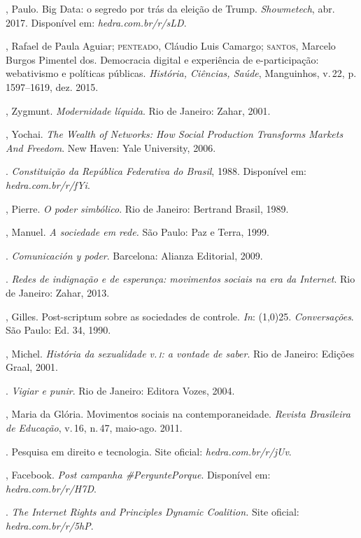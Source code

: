 \begin{bibliohedra}
, Paulo. Big Data: o segredo por trás da eleição de Trump. \textit{Showmetech}, abr. 2017. Disponível em: \textit{hedra.com.br/r/sLD}.

, Rafael de Paula Aguiar; \textsc{penteado}, Cláudio Luis Camargo; \textsc{santos}, Marcelo Burgos Pimentel dos. Democracia digital e experiência de
e-participação: webativismo e políticas públicas. \textit{História, Ciências,
Saúde}, Manguinhos, v.\,22, p.\,1597--1619, dez. 2015.

, Zygmunt. \textit{Modernidade líquida}. Rio de Janeiro: Zahar, 2001.

, Yochai. \textit{The Wealth of Networks: How Social Production
Transforms Markets And Freedom}. New Haven: Yale University, 2006.

. \textit{Constituição da República
Federativa do Brasil}, 1988. Disponível em: \textit{hedra.com.br/r/fYi}.

, Pierre. \textit{O poder simbólico}. Rio de Janeiro: Bertrand Brasil, 1989.

, Manuel. \textit{A sociedade em rede.} São Paulo: Paz e Terra,
1999.

\titidem. \textit{Comunicación y poder}. Barcelona: Alianza
Editorial, 2009.

\titidem. \textit{Redes de indignação e de esperança:
movimentos sociais na era da Internet}. Rio de Janeiro: Zahar, 2013.

, Gilles. Post-scriptum sobre as sociedades de controle. \textit{In}: \line(1,0){25}. \textit{Conversações}. São Paulo: Ed. 34, 1990.

, Michel. \textit{História da sexualidade v.\,\textsc{i}: a vontade de
saber}. Rio de Janeiro: Edições Graal, 2001.

\titidem. \textit{Vigiar e punir}. Rio de Janeiro: Editora Vozes, 2004.

, Maria da Glória. Movimentos sociais na contemporaneidade.
\textit{Revista Brasileira de Educação}, v.\,16, n.\,47, maio-ago. 2011.

. Pesquisa em direito e tecnologia. Site oficial: \textit{hedra.com.br/r/jUv}.

, Facebook. \textit{Post campanha \#PerguntePorque}.
Disponível em: \textit{hedra.com.br/r/H7D}.

. \textit{The Internet Rights and Principles Dynamic
Coalition.} Site oficial: \textit{hedra.com.br/r/5hP}.


\end{bibliohedra}
